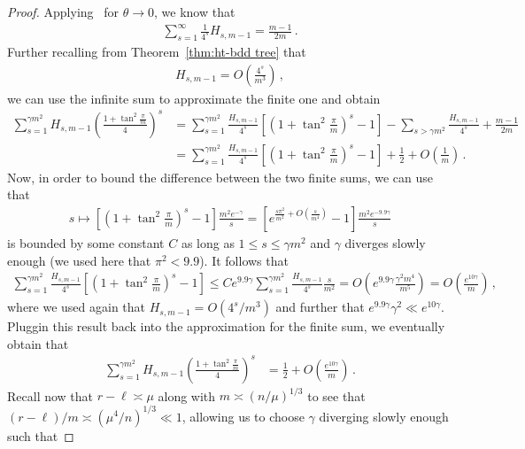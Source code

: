 \documentclass{article}
\newcommand{\1}{\mathbbm{1}}								%
\theoremstyle{definition}
\numberwithin{equation}{section}
\begin{document}
\begin{proof}
    Applying~\cite[Eq(9)]{de1972average} for $\theta\rightarrow0$, we know that
    \begin{align*}
        \sum_{s=1}^\infty\frac{1}{4^s}H_{s,m-1}=\frac{m-1}{2m}\,.
    \end{align*}
    Further recalling from Theorem~\ref{thm:ht-bdd tree} that
    \begin{align*}
        H_{s,m-1}=O\left(\frac{4^s}{m^3}\right)\,,
    \end{align*}
    we can use the infinite sum to approximate the finite one and obtain
    \begin{align*}
        \sum_{s=1}^{\gamma m^2}H_{s,m-1}\left(\frac{1+\tan^2\frac{\pi}{m}}{4}\right)^s
        &=\sum_{s=1}^{\gamma m^2}\frac{H_{s,m-1}}{4^s}\left[\left(1+\tan^2\frac{\pi}{m}\right)^s-1\right]-\sum_{s>\gamma m^2}\frac{H_{s,m-1}}{4^s}+\frac{m-1}{2m}\\
        &=\sum_{s=1}^{\gamma m^2}\frac{H_{s,m-1}}{4^s}\left[\left(1+\tan^2\frac{\pi}{m}\right)^s-1\right]+\frac{1}{2}+O\left(\frac{1}{m}\right)\,.
    \end{align*}
    Now, in order to bound the difference between the two finite sums, we can use that
    \begin{align*}
        s\mapsto\left[\left(1+\tan^2\frac{\pi}{m}\right)^s-1\right]\frac{m^2e^{-\gamma}}{s}=\left[e^{\frac{s\pi^2}{m^2}+O\left(\frac{s}{m^4}\right)}-1\right]\frac{m^2e^{-9.9\gamma}}{s}
    \end{align*}
    is bounded by some constant $C$ as long as $1\leq s\leq\gamma m^2$ and $\gamma$ diverges slowly enough (we used here that $\pi^2<9.9$).
    It follows that
    \begin{align*}
        \sum_{s=1}^{\gamma m^2}\frac{H_{s,m-1}}{4^s}\left[\left(1+\tan^2\frac{\pi}{m}\right)^s-1\right]\leq Ce^{9.9\gamma}\sum_{s=1}^{\gamma m^2}\frac{H_{s,m-1}}{4^s}\frac{s}{m^2}=O\left(e^{9.9\gamma}\frac{\gamma^2m^4}{m^5}\right)=O\left(\frac{e^{10\gamma}}{m}\right)\,,
    \end{align*}
    where we used again that $H_{s,m-1}=O(4^s/m^3)$ and further that $e^{9.9\gamma}\gamma^2\ll e^{10\gamma}$.
    Pluggin this result back into the approximation for the finite sum, we eventually obtain that
    \begin{align*}
        \sum_{s=1}^{\gamma m^2}H_{s,m-1}\left(\frac{1+\tan^2\frac{\pi}{m}}{4}\right)^s
        &=\frac{1}{2}+O\left(\frac{e^{10\gamma}}{m}\right)\,.
    \end{align*}
    Recall now that $r-\ell\asymp \mu$ along with $m\asymp (n/\mu)^{1/3}$ to see that $(r-\ell)/m\asymp (\mu^4/n)^{1/3}\ll1$, allowing us to choose $\gamma$ diverging slowly enough such that

\end{proof}
\end{document}
